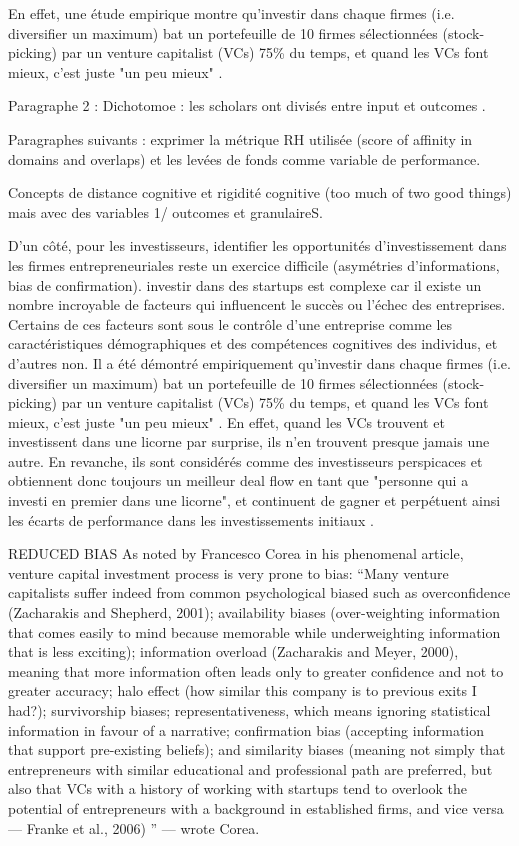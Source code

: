 \documentclass[11pt]{article}
\begin{document}
En effet, une étude empirique montre qu'investir dans chaque firmes (i.e. diversifier un maximum) bat un portefeuille de 10 firmes sélectionnées (stock-picking) par un venture capitalist (VCs) 75\% du temps, et quand les VCs font mieux, c'est juste "un peu mieux" \citep{othman2020angelistdata}.



Paragraphe 2 : Dichotomoe : les scholars ont divisés entre input et outcomes \citep{marvel2016human}.

Paragraphes suivants : exprimer la métrique RH utilisée (score of affinity in domains and overlaps) et les levées de fonds comme variable de performance.

Concepts de distance cognitive et rigidité cognitive (too much of two good things) mais avec des variables 1/ outcomes et granulaireS.

D'un côté, pour les investisseurs, identifier les opportunités d'investissement dans les firmes entrepreneuriales reste un exercice difficile (asymétries d'informations, bias de confirmation). investir dans des startups est complexe car il existe un nombre incroyable de facteurs qui influencent le succès ou l'échec des entreprises. Certains de ces facteurs sont sous le contrôle d'une entreprise comme les caractéristiques démographiques et des compétences cognitives des individus, et d'autres non. Il a été démontré empiriquement qu'investir dans chaque firmes (i.e. diversifier un maximum) bat un portefeuille de 10 firmes sélectionnées (stock-picking) par un venture capitalist (VCs) 75\% du temps, et quand les VCs font mieux, c'est juste "un peu mieux" \citep{othman2020angelistdata}. En effet, quand les VCs trouvent et investissent dans une licorne par surprise, ils n'en trouvent presque jamais une autre. En revanche, ils sont considérés comme des investisseurs perspicaces et obtiennent donc toujours un meilleur deal flow en tant que "personne qui a investi en premier dans une licorne", et continuent de gagner et perpétuent ainsi les écarts de performance dans les investissements initiaux \citep{nanda2020persistent}.


REDUCED BIAS
As noted by Francesco Corea in his phenomenal article, venture capital investment process is very prone to bias:
“Many venture capitalists suffer indeed from common psychological biased such as overconfidence (Zacharakis and Shepherd, 2001); availability biases (over-weighting information that comes easily to mind because memorable while underweighting information that is less exciting); information overload (Zacharakis and Meyer, 2000), meaning that more information often leads only to greater confidence and not to greater accuracy; halo effect (how similar this company is to previous exits I had?); survivorship biases; representativeness, which means ignoring statistical information in favour of a narrative; confirmation bias (accepting information that support pre-existing beliefs); and similarity biases (meaning not simply that entrepreneurs with similar educational and professional path are preferred, but also that VCs with a history of working with startups tend to overlook the potential of entrepreneurs with a background in established firms, and vice versa — Franke et al., 2006) ” — wrote Corea.
\end{document}
